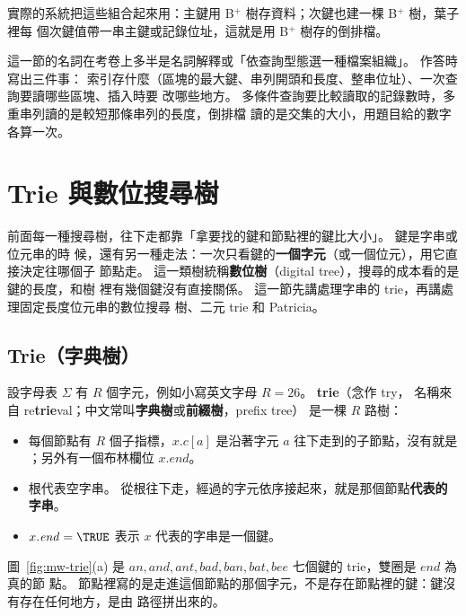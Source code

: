 實際的系統把這些組合起來用：主鍵用 B$^{+}$ 樹存資料；次鍵也建一棵 B$^{+}$ 樹，葉子裡每
個次鍵值帶一串主鍵或記錄位址，這就是用 B$^{+}$ 樹存的倒排檔。

\begin{examnote}
這一節的名詞在考卷上多半是名詞解釋或「依查詢型態選一種檔案組織」。 作答時寫出三件事：
索引存什麼（區塊的最大鍵、串列開頭和長度、整串位址）、一次查詢要讀哪些區塊、插入時要
改哪些地方。 多條件查詢要比較讀取的記錄數時，多重串列讀的是較短那條串列的長度，倒排檔
讀的是交集的大小，用題目給的數字各算一次。
\end{examnote}

\section{Trie 與數位搜尋樹}
\label{sec:mw-trie}

前面每一種搜尋樹，往下走都靠「拿要找的鍵和節點裡的鍵比大小」。 鍵是字串或位元串的時
候，還有另一種走法：一次只看鍵的\textbf{一個字元}（或一個位元），用它直接決定往哪個子
節點走。 這一類樹統稱\textbf{數位樹}（digital tree），搜尋的成本看的是鍵的長度，和樹
裡有幾個鍵沒有直接關係。 這一節先講處理字串的 trie，再講處理固定長度位元串的數位搜尋
樹、二元 trie 和 Patricia。

\subsection{Trie（字典樹）}
\label{sec:mw-trie-basic}

設字母表 $\Sigma$ 有 $R$ 個字元，例如小寫英文字母 $R = 26$。 \textbf{trie}（念作 try，
名稱來自 re\textbf{trie}val；中文常叫\textbf{字典樹}或\textbf{前綴樹}，prefix tree）
是一棵 $R$ 路樹：
\begin{itemize}
\item 每個節點有 $R$ 個子指標，$x.c[a]$ 是沿著字元 $a$ 往下走到的子節點，沒有就是
\NIL；另外有一個布林欄位 $x.\mathit{end}$。
\item 根代表空字串。 從根往下走，經過的字元依序接起來，就是那個節點\textbf{代表的字串}。
\item $x.\mathit{end} = \TRUE$ 表示 $x$ 代表的字串是一個鍵。
\end{itemize}
圖~\ref{fig:mw-trie}(a) 是 $\mathit{an}, \mathit{and}, \mathit{ant}, \mathit{bad},
\mathit{ban}, \mathit{bat}, \mathit{bee}$ 七個鍵的 trie，雙圈是 $\mathit{end}$ 為真的節
點。 節點裡寫的是走進這個節點的那個字元，不是存在節點裡的鍵：鍵沒有存在任何地方，是由
路徑拼出來的。

